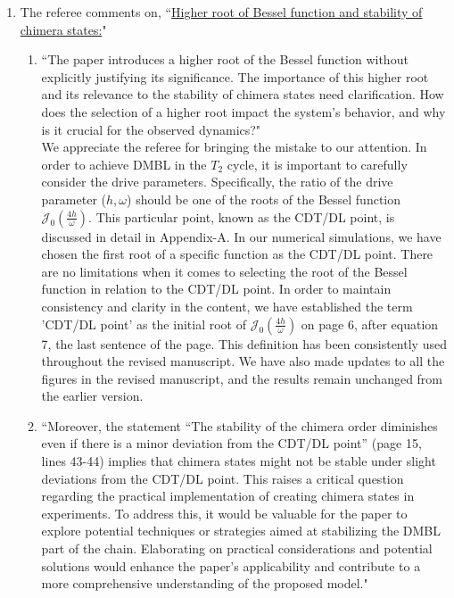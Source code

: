 \documentclass[aps,prb,reprint,showpacs,floatfix,superscriptaddress, onecolumn, nofootinbib, 10pt]{revtex4-2}
\newcommand{\response}[1]{{\color{black}#1}} %
\newcommand{\comment}[1]{{\color{blue}#1}} %
\begin{document}
\begin{enumerate}
\begin{enumerate}
		\item The referee comments on, \comment{``\underline{Higher root of Bessel function and stability of chimera states:}"}\\
		\begin{enumerate}
			\item \comment{``The paper introduces a higher root of the Bessel function without explicitly justifying its significance. The importance of this higher root and its relevance to the stability
				of chimera states need clarification. How does the selection of a higher root impact the system's behavior, and why is it crucial for the observed dynamics?"}\\
			
			\response{We appreciate the referee for bringing the mistake to our attention. In order to achieve DMBL in the $T_2$ cycle, it is important to carefully consider the drive parameters. Specifically, the ratio of the drive parameter ($h,\omega$) should be one of the roots of the Bessel function $\mathcal{J}_0\left(\frac{4h}{\omega}\right)$. This particular point, known as the CDT/DL point, is discussed in detail in Appendix-A. In our numerical simulations, we have chosen the first root of a specific function as the CDT/DL point. There are no limitations when it comes to selecting the root of the Bessel function in relation to the CDT/DL point. In order to maintain consistency and clarity in the content, we have established the term 'CDT/DL point' as the initial root of $\mathcal{J}_0\left(\frac{4h}{\omega}\right)$ on page 6, after equation 7, the last sentence of the page. This definition has been consistently used throughout the revised manuscript. We have also made updates to all the figures in the revised manuscript, and the results remain unchanged from the earlier version.
		}
		
			\item \comment{``Moreover, the statement “The stability of the chimera order diminishes even if there is a minor deviation from the CDT/DL point” (page 15, lines 43-44) implies that chimera states might not be stable under slight deviations from the CDT/DL point. This raises a critical question regarding the practical implementation of creating chimera states in experiments. To address this, it would be valuable for the paper to explore potential techniques or strategies aimed at stabilizing the DMBL part of the chain. Elaborating on practical considerations and potential solutions would enhance the paper's applicability and contribute to a more comprehensive understanding of the proposed model."}\\
			

\end{enumerate}
\end{enumerate}
\end{enumerate}
\end{document}
